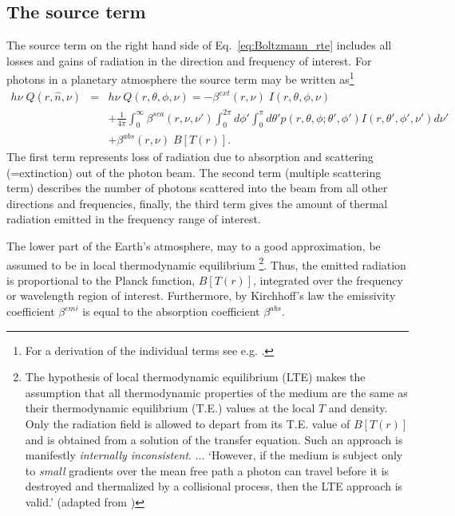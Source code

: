 \subsection{The source term}
The source term on the right hand side of Eq.~\ref{eq:Boltzmann_rte}
includes all losses and gains of radiation in the direction and
frequency of interest. For photons in a planetary atmosphere the
source term may be written as\footnote{For a derivation of the
  individual terms see e.g. \citet{chand60}.}
\begin{eqnarray}
h\nu\;Q( r,\hat{n}, \nu) &=& h\nu\;Q(r, \theta, \phi, \nu)
= -\beta^{ext}(r, \nu)\;
I(r,\theta, \phi, \nu)
\nonumber\\ &&
+\frac{1}{4\pi}\int_{0}^{\infty}\beta^{sca}(r,\nu,\nu')\int_{0}^{2\pi}d\phi '\int_{0}^{\pi}d\theta '
p(r,\theta, \phi; \theta', \phi') 
I( r,\theta ', \phi ', \nu') d\nu'
\nonumber\\ &&
+\beta^{abs}(r, \nu)\;B[T(r)].
  \label{eq:GeneralSource}
\end{eqnarray}
The first term represents loss of radiation due to absorption and
scattering (=extinction)
out of the photon beam. The second term (multiple scattering term) describes the
number of photons scattered into the beam from all other directions
and frequencies, finally, the third term gives the amount of thermal
radiation emitted in the frequency range of interest. 

The lower part of the Earth's atmosphere, may to a good approximation,
be assumed to be in local thermodynamic equilibrium
\footnote{
The hypothesis of local thermodynamic equilibrium (LTE) makes the
assumption that all thermodynamic properties of the medium are the same as
their thermodynamic equilibrium (T.E.) values at the local $T$ and density.
Only the radiation field is allowed to depart from its T.E. value of
$B[T(r)]$ and is obtained from a solution of the transfer equation. Such
an approach is manifestly {\it internally inconsistent}. $\ldots$ 
`However, if the medium is subject  only to {\it small} gradients over the
mean free path a photon can travel before it is destroyed and 
thermalized by a collisional process, then the LTE approach is valid.'
(adapted from \citet[p. 26]{Mihalas1978})}.
Thus, the
emitted radiation is proportional to the Planck function, $B[T(r)]$,
integrated over the frequency or wavelength region of interest.
Furthermore, by Kirchhoff's law the emissivity coefficient $\beta^{emi}$
is equal to the absorption coefficient $\beta^{abs}$.

